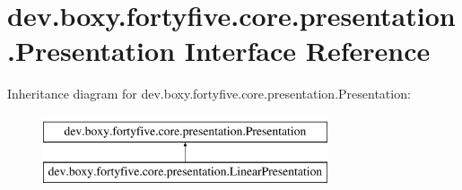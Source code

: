 \hypertarget{interfacedev_1_1boxy_1_1fortyfive_1_1core_1_1presentation_1_1_presentation}{
\section{dev.boxy.fortyfive.core.presentation.Presentation Interface Reference}
\label{d3/de3/interfacedev_1_1boxy_1_1fortyfive_1_1core_1_1presentation_1_1_presentation}
}
Inheritance diagram for dev.boxy.fortyfive.core.presentation.Presentation:\begin{figure}[H]
\begin{center}
\leavevmode
\includegraphics[height=2.000000cm]{d3/de3/interfacedev_1_1boxy_1_1fortyfive_1_1core_1_1presentation_1_1_presentation}
\end{center}
\end{figure}

